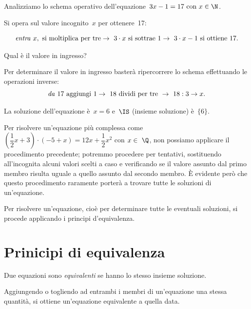  \begin{esempio}
Analizziamo lo schema operativo dell'equazione~\(3x-1=17 \text{ con } 
x\in\N\).

Si opera sul valore incognito~\(x\) per ottenere~17:

\[\text{\emph{entra} } x,\text{ si moltiplica per tre}\to~3\cdot x%
\text{ si sottrae } 1\to~3\cdot x-1 \text{ si ottiene } 17.\]

Qual è il valore in ingresso?

Per determinare il valore in ingresso basterà ripercorrere lo schema
 effettuando le operazioni inverse:
\[\text{\emph{da} } 17 \text{ aggiungi } 1\to~18 \text{ dividi per tre 
}\to~18:3 
\to x.\]

La soluzione dell'equazione è~\(x = 6\) e~\(\IS\) (insieme
soluzione) è~\(\{6\}\).
 \end{esempio}


Per risolvere un'equazione più complessa come
\(\left(\dfrac{1}{2}x+3\right)\cdot (-5+x)=12x+\dfrac{1}{2}x^{2}\) con
\(x\in~\Q\), non possiamo applicare il procedimento precedente; potremmo
procedere per tentativi, sostituendo all'incognita
alcuni valori scelti a caso e verificando se il valore assunto dal
primo membro risulta uguale a quello assunto dal secondo membro. È
evidente però che questo procedimento raramente porterà a trovare
tutte le soluzioni di un'equazione.

\osservazione
Per risolvere un'equazione, cioè per determinare tutte
le eventuali soluzioni, si procede applicando i principi
d'equivalenza.

\section{Prinicipi di equivalenza}
\label{sec:13_principi}

\begin{definizione}
 Due equazioni sono \emph{equivalenti} se hanno lo stesso insieme soluzione.
\end{definizione}

\begin{principio}
Aggiungendo o togliendo ad entrambi i membri di un'equazione 
una stessa quantità, 
si ottiene un'equazione equivalente a quella data.
\end{principio}

